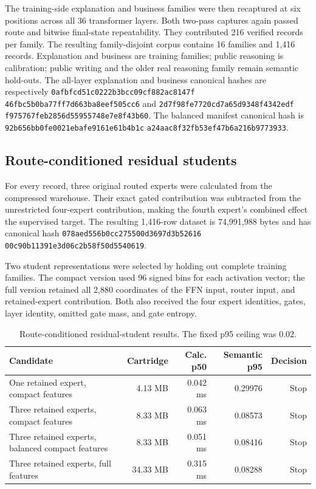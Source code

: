 The training-side explanation and business families were then recaptured at six
positions across all 36 transformer layers.  Both two-pass captures again passed
route and bitwise final-state repeatability.  They contributed 216 verified
records per family.  The resulting family-disjoint corpus contains 16 families
and 1,416 records.  Explanation and business are training families; public
reasoning is calibration; public writing and the older real reasoning family
remain semantic hold-outs.  The all-layer explanation and business canonical
hashes are respectively
\texttt{0afbfcd51c0222b3bcc09cf882ac8147f}\allowbreak
\texttt{46fbc5b0ba77ff7d663ba8eef505cc6}
and
\texttt{2d7f98fe7720cd7a65d9348f4342edf}\allowbreak
\texttt{f975767feb2856d55955748e7e8f43b60}.
The balanced manifest canonical hash is
\texttt{92b656bb0fe0021ebafe9161e61b4b1c}\allowbreak
\texttt{a24aac8f32fb53ef47b6a216b9773933}.

\subsection{Route-conditioned residual students}

For every record, three original routed experts were calculated from the
compressed warehouse.  Their exact gated contribution was subtracted from the
unrestricted four-expert contribution, making the fourth expert's combined
effect the supervised target.  The resulting 1,416-row dataset is 74,991,988
bytes and has canonical hash
\texttt{078aed556b0cc275500d3697d3b52616}\allowbreak
\texttt{00c90b11391e3d06c2b58f50d5540619}.

Two student representations were selected by holding out complete training
families.  The compact version used 96 signed bins for each activation vector;
the full version retained all 2,880 coordinates of the FFN input, router input,
and retained-expert contribution.  Both also received the four expert identities,
gates, layer identity, omitted gate mass, and gate entropy.

\begin{table}[htbp]
\centering
\small
\begin{tabularx}{\linewidth}{Xrrrr}
\toprule
Candidate & Cartridge & Calc. p50 & Semantic p95 & Decision \\
\midrule
One retained expert, compact features & 4.13 MB & 0.042 ms & 0.29976 & Stop \\
Three retained experts, compact features & 8.33 MB & 0.063 ms & 0.08573 & Stop \\
Three retained experts, balanced compact features & 8.33 MB & 0.051 ms & 0.08416 & Stop \\
Three retained experts, full features & 34.33 MB & 0.315 ms & 0.08288 & Stop \\
\bottomrule
\end{tabularx}
\caption{Route-conditioned residual-student results.  The fixed p95 ceiling was 0.02.}
\end{table}

